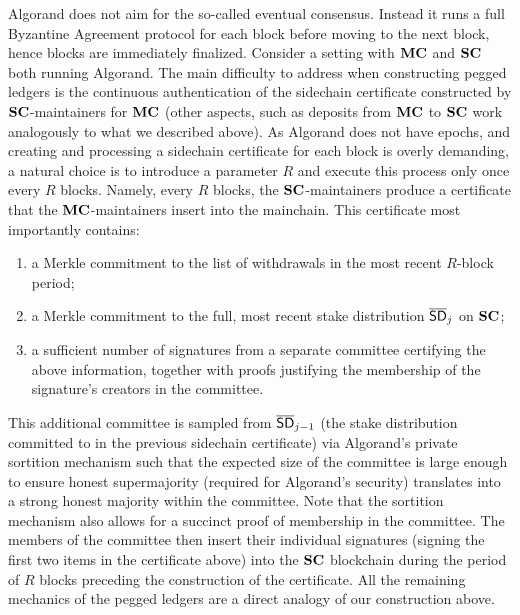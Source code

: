 Algorand does not aim for the so-called eventual consensus. Instead it runs a
full Byzantine Agreement protocol for each block before moving to the next
block, hence blocks are immediately finalized. Consider a setting with $\mathbf{MC}$
and $\mathbf{SC}$ both running Algorand. The main difficulty to address when
constructing pegged ledgers is the continuous  authentication of the
sidechain certificate constructed by $\mathbf{SC}$-maintainers for $\mathbf{MC}$ (other aspects,
such as deposits from $\mathbf{MC}$ to $\mathbf{SC}$ work analogously to what we
described above).
%
As Algorand does not have epochs, and creating and processing a sidechain
certificate for each block is overly demanding, a natural choice is to
introduce a parameter $R$ and execute this process only once every $R$ blocks.
Namely, every $R$ blocks, the $\mathbf{SC}$-maintainers produce a certificate that
the $\mathbf{MC}$-maintainers insert into the mainchain. This certificate most
importantly contains:
\begin{enumerate}
\item
a Merkle commitment to the list of withdrawals in the most recent $R$-block
    period;
\item
a Merkle commitment to the full, most recent stake distribution $\mathsf{\overline{SD}}_j$ on
    $\mathbf{SC}$;
\item
a sufficient number of signatures from a separate committee
certifying the above information, together with proofs justifying the membership
of the signature's creators in the committee.
\end{enumerate}
This additional committee is sampled from $\mathsf{\overline{SD}}_{j-1}$ (the stake
distribution committed to in the previous sidechain certificate) via Algorand's
private sortition mechanism such that the expected size of the
committee is large enough to ensure honest supermajority
(required for Algorand's security) translates into a strong
honest majority within the committee.
Note that the sortition mechanism also allows for a succinct proof of membership
in the committee.
The members of the committee then
insert their individual signatures (signing the first two items in the
certificate above) into the $\mathbf{SC}$ blockchain during the period of $R$ blocks
preceding the construction of the certificate.
%
All the remaining mechanics of the pegged ledgers are a direct analogy of
our construction above.
